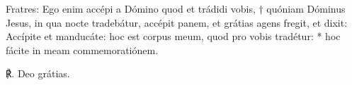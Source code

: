 \begin{flushright}{\fontsize{9}{11}}\end{flushright}
Fratres: Ego enim accépi a Dómino quod et trádidi vobis, † quóniam Dóminus Jesus, in qua nocte tradebátur, accépit panem, et grátias agens fregit, et dixit: Accípite et manducáte: hoc est corpus meum, quod pro vobis tradétur: * hoc fácite in meam commemoratiónem.

℟. Deo grátias.